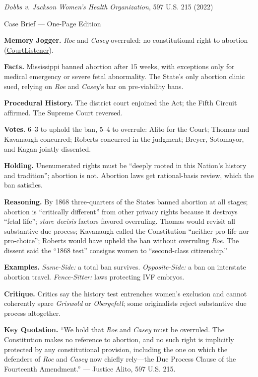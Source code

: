 \documentclass[12pt]{article}
\begin{document}
\begin{center}
{\Large \textit{Dobbs v. Jackson Women's Health Organization}, 597 U.S. 215 (2022)\par}
\vspace{0.3em}
{\normalsize Case Brief --- One-Page Edition\par}
\end{center}

\textbf{Memory Jogger.} \textit{Roe} and \textit{Casey} overruled: no constitutional right to abortion (\href{https://www.courtlistener.com/opinion/6481357/dobbs-v-jackson-womens-health-organization/}{CourtListener}).

\textbf{Facts.} Mississippi banned abortion after 15 weeks, with exceptions only for medical emergency or severe fetal abnormality. The State's only abortion clinic sued, relying on \textit{Roe} and \textit{Casey}'s bar on pre-viability bans.

\textbf{Procedural History.} The district court enjoined the Act; the Fifth Circuit affirmed. The Supreme Court reversed.

\textbf{Votes.} 6--3 to uphold the ban, 5--4 to overrule: Alito for the Court; Thomas and Kavanaugh concurred; Roberts concurred in the judgment; Breyer, Sotomayor, and Kagan jointly dissented.

\textbf{Holding.} Unenumerated rights must be ``deeply rooted in this Nation's history and tradition''; abortion is not. Abortion laws get rational-basis review, which the ban satisfies.

\textbf{Reasoning.} By 1868 three-quarters of the States banned abortion at all stages; abortion is ``critically different'' from other privacy rights because it destroys ``fetal life''; \textit{stare decisis} factors favored overruling. Thomas would revisit all substantive due process; Kavanaugh called the Constitution ``neither pro-life nor pro-choice''; Roberts would have upheld the ban without overruling \textit{Roe}. The dissent said the ``1868 test'' consigns women to ``second-class citizenship.''

\textbf{Examples.} \emph{Same-Side:} a total ban survives. \emph{Opposite-Side:} a ban on interstate abortion travel. \emph{Fence-Sitter:} laws protecting IVF embryos.

\textbf{Critique.} Critics say the history test entrenches women's exclusion and cannot coherently spare \textit{Griswold} or \textit{Obergefell}; some originalists reject substantive due process altogether.

\textbf{Key Quotation.} ``We hold that \textit{Roe} and \textit{Casey} must be overruled. The Constitution makes no reference to abortion, and no such right is implicitly protected by any constitutional provision, including the one on which the defenders of \textit{Roe} and \textit{Casey} now chiefly rely---the Due Process Clause of the Fourteenth Amendment.'' --- Justice Alito, 597 U.S. 215.
\end{document}
